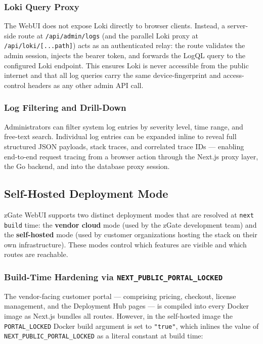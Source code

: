 \subsubsection{Loki Query Proxy}
The WebUI does not expose Loki directly to browser clients. Instead, a server-side route at \texttt{/api/admin/logs} (and the parallel Loki proxy at \texttt{/api/loki/[...path]}) acts as an authenticated relay: the route validates the admin session, injects the bearer token, and forwards the LogQL query to the configured Loki endpoint. This ensures Loki is never accessible from the public internet and that all log queries carry the same device-fingerprint and access-control headers as any other admin API call.

\subsubsection{Log Filtering and Drill-Down}
Administrators can filter system log entries by severity level, time range, and free-text search. Individual log entries can be expanded inline to reveal full structured JSON payloads, stack traces, and correlated trace IDs — enabling end-to-end request tracing from a browser action through the Next.js proxy layer, the Go backend, and into the database proxy session.


\subsection{Self-Hosted Deployment Mode}

zGate WebUI supports two distinct deployment modes that are resolved at \texttt{next build} time: the \textbf{vendor cloud} mode (used by the zGate development team) and the \textbf{self-hosted} mode (used by customer organizations hosting the stack on their own infrastructure). These modes control which features are visible and which routes are reachable.

\subsubsection{Build-Time Hardening via \texttt{NEXT\_PUBLIC\_PORTAL\_LOCKED}}
The vendor-facing customer portal --- comprising pricing, checkout, license management, and the Deployment Hub pages --- is compiled into every Docker image as Next.js bundles all routes. However, in the self-hosted image the \texttt{PORTAL\_LOCKED} Docker build argument is set to \texttt{"true"}, which inlines the value of \texttt{NEXT\_PUBLIC\_PORTAL\_LOCKED} as a literal constant at build time:

